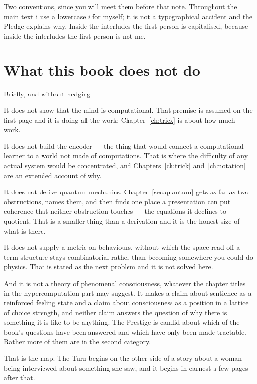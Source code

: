 Two conventions, since you will meet them before that note.
Throughout the main text i use a lowercase \emph{i} for myself; it
is not a typographical accident and the Pledge explains why.
Inside the interludes the first person is capitalised, because
inside the interludes the first person is not me.

\section*{What this book does not do}

Briefly, and without hedging.

It does not show that the mind is computational.
That premise is assumed on the first page and it is doing all the
work; Chapter~\ref{ch:trick} is about how much work.

It does not build the encoder --- the thing that would connect a
computational learner to a world not made of computations.
That is where the difficulty of any actual system would be
concentrated, and Chapters~\ref{ch:trick}
and~\ref{ch:notation} are an extended account of why.

It does not derive quantum mechanics.
Chapter~\ref{sec:quantum} gets as far as two obstructions, names
them, and then finds one place a presentation can put coherence
that neither obstruction touches --- the equations it declines to
quotient.
That is a smaller thing than a derivation and it is the honest size
of what is there.

It does not supply a metric on behaviours, without which the space
read off a term structure stays combinatorial rather than
becoming somewhere you could do physics.
That is stated as the next problem and it is not solved here.

And it is not a theory of phenomenal consciousness, whatever the
chapter titles in the hypercomputation part may suggest.
It makes a claim about sentience as a reinforced feeling state and
a claim about consciousness as a position in a lattice of choice
strength, and neither claim answers the question of why there is
something it is like to be anything.
The Prestige is candid about which of the book's questions have
been answered and which have only been made tractable.
Rather more of them are in the second category.

\bigskip
\noindent
That is the map.
The Turn begins on the other side of a story about a woman being
interviewed about something she saw, and it begins in earnest a few
pages after that.

\renewcommand{\thefigure}{\thechapter.\arabic{figure}}\setcounter{figure}{0}
